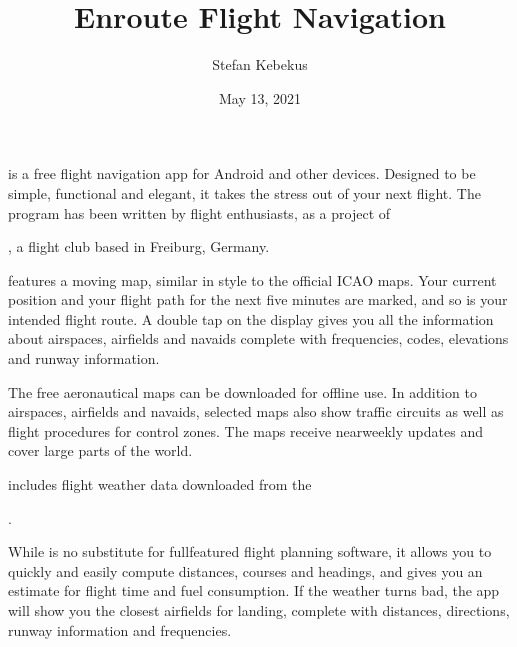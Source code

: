 \documentclass[letterpaper,10pt,english]{sphinxmanual}
\title{Enroute Flight Navigation}
\date{May 13, 2021}
\author{Stefan Kebekus}
\let\sphinxpxdimen\pdfpxdimen\else\newdimen\sphinxpxdimen
\begin{document}
\pagestyle{empty}
\sphinxmaketitle
\pagestyle{plain}
\sphinxtableofcontents
\pagestyle{normal}
\label{\detokenize{index::doc}}


\noindent{\hspace*{\fill}\sphinxincludegraphics[width=100\sphinxpxdimen]{{de.akaflieg_freiburg.enroute}.png}\hspace*{\fill}}

\sphinxAtStartPar
{} is a free flight navigation app for Android and
other devices.  Designed to be simple, functional and elegant, it takes the
stress out of your next flight. The program has been written by flight
enthusiasts, as a project of %
\begin{footnote}[1]\sphinxAtStartFootnote
{}
%
\end{footnote}, a flight club based in Freiburg, Germany.

\sphinxAtStartPar
{} features a moving map, similar in style to the
official ICAO maps. Your current position and your flight path for the next five
minutes are marked, and so is your intended flight route. A double tap on the
display gives you all the information about airspaces, airfields and navaids \textendash{}
complete with frequencies, codes, elevations and runway information.

\sphinxAtStartPar
The free aeronautical maps can be downloaded for offline use. In addition to
airspaces, airfields and navaids, selected maps also show traffic circuits as
well as flight procedures for control zones. The maps receive near\sphinxhyphen{}weekly
updates and cover large parts of the world.

\sphinxAtStartPar
{} includes flight weather data downloaded from the
%
\begin{footnote}[2]\sphinxAtStartFootnote
{}
%
\end{footnote}.

\sphinxAtStartPar
While  is no substitute for full\sphinxhyphen{}featured flight
planning software, it allows you to quickly and easily compute distances,
courses and headings, and gives you an estimate for flight time and fuel
consumption. If the weather turns bad, the app will show you the closest
airfields for landing, complete with distances, directions, runway information
and frequencies.
\end{document}
